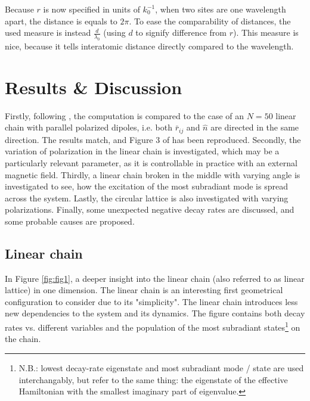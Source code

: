 \documentclass{article}
\begin{document}
Because $r$ is now specified in units of $k_0^{-1}$, when two sites are one wavelength apart, the distance is equals to $2\pi$. To ease the comparability of distances, the used measure is instead $\frac{d}{\lambda_0}$ (using $d$ to signify difference from $r$). This measure is nice, because it tells interatomic distance directly compared to the wavelength.

\section{Results \& Discussion}\label{sec:results}

Firstly, following \cite{Asenjo}, the computation is compared to the case of an $N=50$ linear chain with parallel polarized dipoles, i.e. both $\bar{r}_{ij}$ and $\hat{n}$ are directed in the same direction. The results match, and Figure 3 of \cite{Asenjo} has been reproduced. Secondly, the variation of polarization in the linear chain is investigated, which may be a particularly relevant parameter, as it is controllable in practice with an external magnetic field. Thirdly, a linear chain broken in the middle with varying angle is investigated to see, how the excitation of the most subradiant mode is spread across the system. Lastly, the circular lattice is also investigated with varying polarizations. Finally, some unexpected negative decay rates are discussed, and some probable causes are proposed. 

\subsection{Linear chain}\label{disc:linear_chain}

In Figure \ref{fig:fig1}, a deeper insight into the linear chain (also referred to as linear lattice) in one dimension. The linear chain is an interesting first geometrical configuration to consider due to its "simplicity". The linear chain introduces less new dependencies to the system and its dynamics. The figure contains both decay rates vs. different variables and the population of the most subradiant states\footnote{N.B.: lowest decay-rate eigenstate and most subradiant mode / state are used interchangably, but refer to the same thing: the eigenstate of the effective Hamiltonian with the smallest imaginary part of eigenvalue.} on the chain. 
\end{document}
